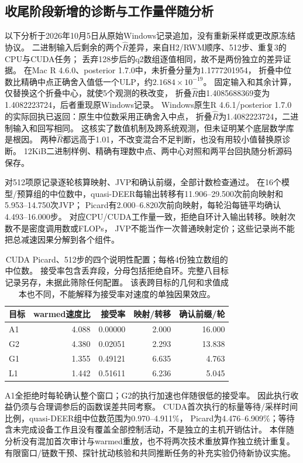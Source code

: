\subsection{收尾阶段新增的诊断与工作量伴随分析}
\label{sec:completion-companion}
以下分析于2026年10月5日从原始Windows记录追加，没有重新采样或更改原冻结协议。
二进制输入后剩余的两个$\hat R$差异，来自H2/RWM顺序、512步、重复3的CPU与CUDA任务；
丢弃128步后的q2数组逐值相同，故不是两份独立的差异证据。
在Mac R 4.6.0、posterior 1.7.0中，未折叠分量为1.1777201954，
折叠中位数比精确中点正确舍入值低一个ULP，约$2.1684\times10^{-19}$。
固定输入和其余计算，仅替换这个折叠中心，就使5个观测的秩改变，
折叠$\hat R$由1.4085688369变为1.4082223724，后者重现原Windows记录。
Windows原生R 4.6.1/posterior 1.7.0的实际回执已返回：原生中位数采用正确舍入中点，
折叠$\hat R$为1.4082223724，二进制输入和回写相同。
这核实了数值机制及跨系统观测，但未证明某个底层数学库是根因。
两种$\hat R$都远高于1.01，不改变混合不足判断，也没有用较小值替换原诊断。
12KiB二进制样例、精确有理数中点、两中心对照和两平台回执随分析源码保存。

对512项原记录逐轮核算映射、JVP和确认前缀，全部计数检查通过。
在16个模型/预算组的中位数中，quasi-DEER每输出转移有11.906--29.500次前向映射和5.953--14.750次JVP；
Picard有2.000--6.820次前向映射，每轮沿每链平均确认4.493--16.000步。
对应CPU/CUDA工作量一致，拒绝自环计入输出转移。映射次数不是密度调用数或FLOPs，
JVP不能当作一次普通映射定价；这些记录尚不能把总减速因果分解到各个组件。

\begin{table}[htbp]\centering\small
\begin{tabular}{lrrrr}\toprule
目标 & warmed速度比 & 接受率 & 映射/转移 & 确认前缀/轮\\\midrule
A1 & 4.088 & 0.00000 & 2.000 & 16.000\\
G2 & 4.380 & 0.02051 & 2.293 & 13.838\\
G1 & 1.355 & 0.49121 & 6.635 & 4.763\\
L1 & 1.442 & 0.51611 & 6.236 & 5.045\\
\bottomrule\end{tabular}
\caption{CUDA Picard、512步的四个说明性配置；每格4份独立数组的中位数。
接受率包含丢弃段，分母包括拒绝自环。完整八目标记录另存，未据此筛除任何配置。
该表跨目标的几何和求值成本也不同，不能解释为接受率对速度的单独因果效应。}
\end{table}

A1全拒绝时每轮确认整个窗口；G2的执行加速也伴随很低的接受率。
因此执行收益仍须与合理调参后的函数误差共同考察。
CUDA首次执行的标量等待/采样时间比例，quasi-DEER组中位数范围为0.970--4.911\%，
Picard为4.476--6.909\%；等待含未完成设备工作且没有覆盖全部控制活动，不是独立的主机开销估计。
本伴随分析没有混加首次审计与warmed重放，也不将两次技术重放算作独立统计重复。
有限窗口/链数干预、探针扰动核验和共同推断任务的补充实验仍待新协议实施。
